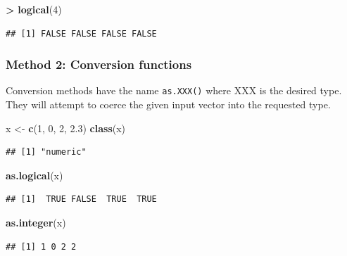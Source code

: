 \documentclass[]{book}
\newenvironment{Shaded}{\begin{snugshade}}{\end{snugshade}}
\newcommand{\DecValTok}[1]{\textcolor[rgb]{0.00,0.00,0.81}{#1}}
\newcommand{\FloatTok}[1]{\textcolor[rgb]{0.00,0.00,0.81}{#1}}
\newcommand{\KeywordTok}[1]{\textcolor[rgb]{0.13,0.29,0.53}{\textbf{#1}}}
\newcommand{\NormalTok}[1]{#1}
\newcommand{\OperatorTok}[1]{\textcolor[rgb]{0.81,0.36,0.00}{\textbf{#1}}}
\newcommand{\StringTok}[1]{\textcolor[rgb]{0.31,0.60,0.02}{#1}}
\begin{document}
\begin{Shaded}
\begin{Highlighting}[]
\OperatorTok{>}\StringTok{ }\KeywordTok{logical}\NormalTok{(}\DecValTok{4}\NormalTok{)}
\end{Highlighting}
\end{Shaded}

\begin{verbatim}
## [1] FALSE FALSE FALSE FALSE
\end{verbatim}

\hypertarget{method-2-conversion-functions}{%
\subsubsection*{Method 2: Conversion functions}\label{method-2-conversion-functions}}

Conversion methods have the name \texttt{as.XXX()} where XXX is the desired type. They will attempt to coerce the given input vector into the requested type.

\begin{Shaded}
\begin{Highlighting}[]
\NormalTok{x <-}\StringTok{ }\KeywordTok{c}\NormalTok{(}\DecValTok{1}\NormalTok{, }\DecValTok{0}\NormalTok{, }\DecValTok{2}\NormalTok{, }\FloatTok{2.3}\NormalTok{)}
\KeywordTok{class}\NormalTok{(x)}
\end{Highlighting}
\end{Shaded}

\begin{verbatim}
## [1] "numeric"
\end{verbatim}

\begin{Shaded}
\begin{Highlighting}[]
\KeywordTok{as.logical}\NormalTok{(x)}
\end{Highlighting}
\end{Shaded}

\begin{verbatim}
## [1]  TRUE FALSE  TRUE  TRUE
\end{verbatim}

\begin{Shaded}
\begin{Highlighting}[]
\KeywordTok{as.integer}\NormalTok{(x)}
\end{Highlighting}
\end{Shaded}

\begin{verbatim}
## [1] 1 0 2 2
\end{verbatim}
\end{document}
